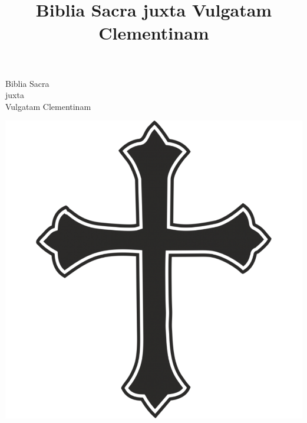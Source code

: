 \documentclass[paper=a5,pagesize=pdftex,15pt,headinclude=on,twoside=off]{scrbook}
\title{Biblia Sacra juxta Vulgatam Clementinam}
\begin{document}
\hspace{0pt}
\vfill
\begin{center}
  \begin{minipage}{0.7\textwidth}
    \begin{center}
      {\headerfont\Huge Biblia Sacra} \\
      {\headerfont\Large juxta} \\
      {\headerfont\Huge Vulgatam Clementinam} \\
    \end{center}
  \end{minipage}
  \vspace{0.1\pageheight}
  \includegraphics[height=0.4\pageheight]{cross-transparent-vector-5.png}
\end{center}
\vfill
\hspace{0pt}
\clrdouble
\clrdouble
\end{document}
